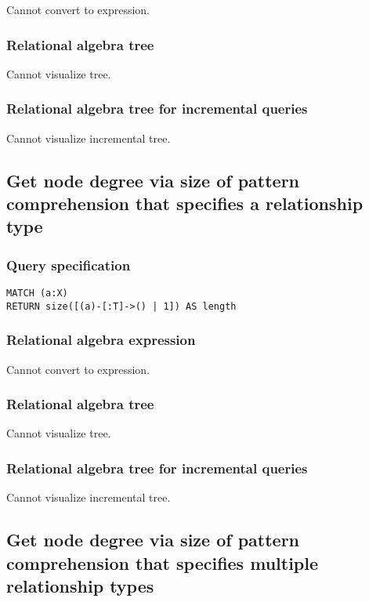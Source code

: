 Cannot convert to expression.

\subsubsection*{Relational algebra tree}

Cannot visualize tree.

\subsubsection*{Relational algebra tree for incremental queries}

Cannot visualize incremental tree.

\subsection{Get node degree via size of pattern comprehension that specifies a relationship type}

\subsubsection*{Query specification}

\begin{lstlisting}
MATCH (a:X)
RETURN size([(a)-[:T]->() | 1]) AS length
\end{lstlisting}

\subsubsection*{Relational algebra expression}

Cannot convert to expression.

\subsubsection*{Relational algebra tree}

Cannot visualize tree.

\subsubsection*{Relational algebra tree for incremental queries}

Cannot visualize incremental tree.

\subsection{Get node degree via size of pattern comprehension that specifies multiple relationship types}

